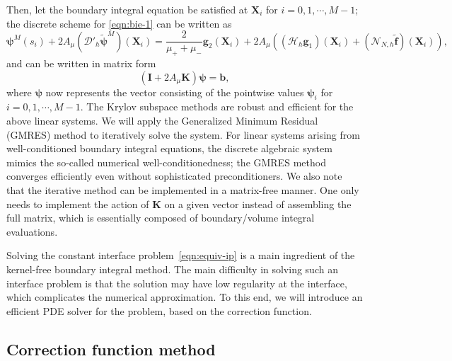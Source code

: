 \documentclass[preprint,11pt]{elsarticle}
\theoremstyle{remark}
\newcommand{\mc}[1]{\mathcal{#1}}
\newcommand{\wt}[1]{\widetilde{#1}}
\newcommand{\bm}[1]{\boldsymbol{#1}}
\begin{document}
Then, let the boundary integral equation be satisfied at $\bm X_i$ for $i=0,1,\cdots,M-1$; the discrete scheme for \eqref{eqn:bie-1} can be written as
\begin{equation}
    \bm \psi^M (s_i) + 2 A_\mu (\mc D'_h\wt{\bm \psi}^M)(\bm X_i) = \frac{2}{\mu_+ +\mu_-} \bm g_2 (\bm X_i) + 2 A_\mu ((\mc H_h \bm g_1)(\bm X_i) + (\mc N_{N,h} \wt {\bm f})(\bm X_i)),
\end{equation}
and can be written in matrix form
\begin{equation}
    (\bm I + 2 A_\mu \bm K) \bm \psi = \bm b,
\end{equation}
where $\bm \psi$ now represents the vector consisting of the pointwise values $\bm \psi_i$ for $i=0,1,\cdots,M-1$.
The Krylov subspace methods are robust and efficient for the above linear systems. We will apply the Generalized Minimum Residual (GMRES) method to iteratively solve the system.
For linear systems arising from well-conditioned boundary integral equations, the discrete algebraic system mimics the so-called numerical well-conditionedness; the GMRES method converges efficiently even without sophisticated preconditioners. 
We also note that the iterative method can be implemented in a matrix-free manner. One only needs to implement the action of $\bm K$ on a given vector instead of assembling the full matrix, which is essentially composed of boundary/volume integral evaluations.

Solving the constant interface problem~\eqref{eqn:equiv-ip} is a main ingredient of the kernel-free boundary integral method. The main difficulty in solving such an interface problem is that the solution may have low regularity at the interface, which complicates the numerical approximation. To this end, we will introduce an efficient PDE solver for the problem, based on the correction function.

\subsection{Correction function method}
\end{document}

